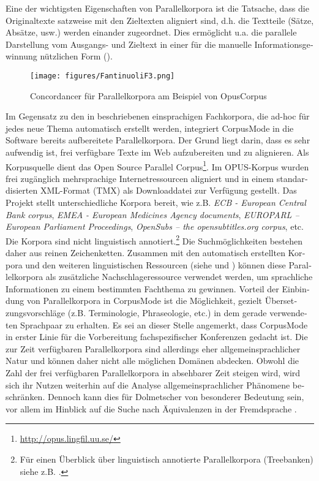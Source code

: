 \documentclass[output=paper]{LSP/langsci}
\begin{document}
\begin{otherlanguage}{ngerman}
Eine der wichtigsten Eigenschaften von Parallelkorpora ist die Tatsache, dass die Originaltexte satzweise mit den Zieltexten aligniert sind, d.h. die Textteile (Sätze, Absätze, usw.) werden einander zugeordnet. Dies ermöglicht u.a. die parallele Darstellung vom Ausgangs- und Zieltext in einer für die manuelle Informationsgewinnung nützlichen Form ().

\begin{figure}
\texttt{[image: figures/FantinuoliF3.png]}
\caption{Concordancer für Parallelkorpora am Beispiel von OpusCorpus}
\label{fig:fantinuoli:3}
\end{figure} 

Im Gegensatz zu den in  beschriebenen einsprachigen Fachkorpora, die ad-hoc für jedes neue Thema automatisch erstellt werden, integriert CorpusMode in die Software bereits aufbereitete Parallelkorpora. Der Grund liegt darin, dass es sehr aufwendig ist, frei verfügbare Texte im Web aufzubereiten und zu alignieren. Als Korpusquelle dient das Open Source Parallel Corpus\footnote{\url{http://opus.lingfil.uu.se/}}. Im OPUS-Korpus wurden frei zugänglich mehrsprachige Internetressourcen aligniert und in einem standardisierten XML-Format (TMX) als Downloaddatei zur Verfügung gestellt. Das Projekt stellt unterschiedliche Korpora bereit, wie z.B. \textit{ECB - European Central Bank corpus}, \textit{EMEA - European Medicines Agency documents}, \textit{EUROPARL -- European Parliament Proceedings}, \textit{OpenSubs -- the opensubtitles.org corpus}, etc. Die Korpora sind nicht linguistisch annotiert.\footnote{Für einen Überblick über linguistisch annotierte Parallelkorpora (Treebanken) siehe z.B. \citet{Hansen-Schirra2009}.} Die Suchmöglichkeiten bestehen daher aus reinen Zeichenketten. Zusammen mit den automatisch erstellten Korpora und den weiteren linguistischen Ressourcen (siehe  und ) können diese Parallelkorpora als zusätzliche Nachschlageressource verwendet werden, um sprachliche Informationen zu einem bestimmten Fachthema zu gewinnen. Vorteil der Einbindung von Parallelkorpora in CorpusMode ist die Möglichkeit, gezielt Übersetzungsvorschläge (z.B. Terminologie, Phraseologie, etc.) in dem gerade verwendeten Sprachpaar zu erhalten. Es sei an dieser Stelle angemerkt, dass CorpusMode in erster Linie für die Vorbereitung fachspezifischer Konferenzen gedacht ist. Die zur Zeit verfügbaren Parallelkorpora sind allerdings eher allgemeinsprachlicher Natur und können daher nicht alle möglichen Domänen abdecken. Obwohl die Zahl der frei verfügbaren Parallelkorpora in absehbarer Zeit steigen wird, wird sich ihr Nutzen weiterhin auf die Analyse allgemeinsprachlicher Phänomene beschränken. Dennoch kann dies für Dolmetscher von besonderer Bedeutung sein, vor allem im Hinblick auf die Suche nach Äquivalenzen in der Fremdsprache \citep{Fantinuoli2006}.


\end{otherlanguage}
\end{document}
